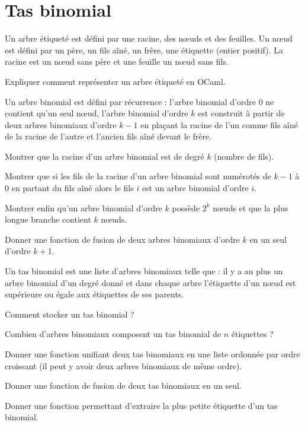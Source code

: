 \renewcommand{\SourceFile}{4-arborescences/src/4-5.ml}

\section{Tas binomial}

Un arbre étiqueté est défini par une racine, des nœuds et des feuilles. Un nœud est défini par un père, un fils aîné, un frère, une étiquette (entier positif). La racine est un nœud sans père et une feuille un nœud sans fils.

\Q
Expliquer comment représenter un arbre étiqueté en OCaml.

\Q
Un arbre binomial est défini par récurrence : l'arbre binomial d'ordre 0 ne contient qu'un seul nœud, l'arbre binomial d'ordre $k$ est construit à partir de deux arbres binomiaux d'ordre $k-1$ en plaçant la racine de l'un comme fils aîné de la racine de l'autre et l'ancien fils aîné devant le frère.
\medskip

Montrer que la racine d'un arbre binomial est de degré $k$ (nombre de fils).
\medskip

Montrer que si les fils de la racine d'un arbre binomial sont numérotés de $k-1$ à 0 en partant du fils aîné alors le fils $i$ est un arbre binomial d'ordre $i$.
\medskip

Montrer enfin qu'un arbre binomial d'ordre $k$ possède $2^k$ nœuds et que la plus longue branche contient $k$ nœuds.

\Q
Donner une fonction de fusion de deux arbres binomiaux d'ordre $k$ en un seul d'ordre $k+1$.

\Q
Un tas binomial est une liste d'arbres binomiaux telle que : il y a au plus un arbre binomial d'un degré donné et dans chaque arbre l'étiquette d'un nœud est supérieure ou égale aux étiquettes de ses parents.
\medskip

Comment stocker un tas binomial ?
\medskip

Combien d'arbres binomiaux composent un tas binomial de $n$ étiquettes ?
\medskip

Donner une fonction unifiant deux tas binomiaux en une liste ordonnée par ordre croissant (il peut y avoir deux arbres binomiaux de même ordre).

\Q
Donner une fonction de fusion de deux tas binomiaux en un seul.
\medskip

Donner une fonction permettant d'extraire la plus petite étiquette d'un tas binomial.
\newpage

\Corrige

